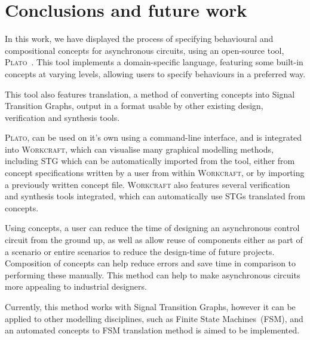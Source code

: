 \documentclass[british,conference,compsoc]{IEEEtran}
\newcommand{\noun}[1]{\textsc{#1}}
\begin{document}
\section{Conclusions and future work\label{sec:conclusions}}

\vspace{-3mm}

In this work, we have displayed the process of specifying behavioural and 
compositional concepts for asynchronous circuits, using an open-source
tool, \noun{Plato}~\cite{2016_concepts_github}. This tool implements a domain-specific 
language, featuring some built-in concepts at varying levels, allowing users to
specify behaviours in a preferred way. 

This tool also features translation, a method of converting concepts into Signal
Transition Graphs, output in a format usable by other existing design, 
verification and synthesis tools. 

\noun{Plato}, can be used on it's own using a command-line interface, and is
integrated into \noun{Workcraft}, which can visualise many graphical modelling
methods, including STG which can be automatically imported from the
tool, either from concept specifications written by a user from within 
\noun{Workcraft}, or by importing a previously written concept file.
\noun{Workcraft} also features several verification and synthesis tools 
integrated, which can automatically use STGs translated from concepts. 

Using concepts, a user can reduce the time of designing an asynchronous
control circuit from the ground up, as well as allow reuse of components
either as part of a scenario or entire scenarios to reduce the design-time
of future projects. Composition of concepts can help
reduce errors and save time in comparison to performing these manually.
This method can help to make asynchronous circuits more appealing
to industrial designers.

Currently, this method works with Signal Transition Graphs, however
it can be applied to other modelling disciplines, such as Finite State
Machines~(FSM), and an automated concepts to FSM translation method
is aimed to be implemented.

\end{document}
